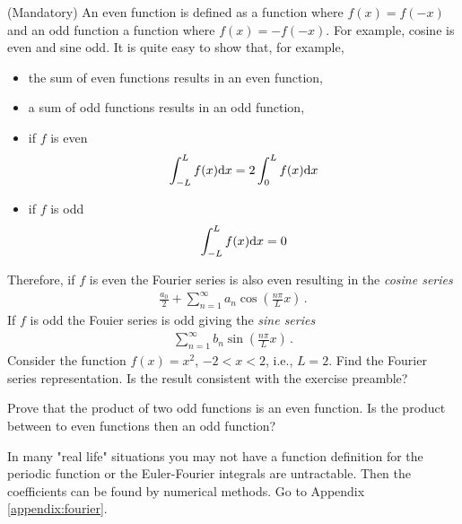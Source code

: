 \begin{exerciseregion}
	\begin{exercise} \label{ex:fourierevenodd}
		(Mandatory) An even function is defined as a function where $f(x) = f(-x)$ and an odd function a function
		where $f(x) = -f(-x)$. For example, cosine is even and sine odd. It is quite easy to show 
		that, for example,  
		\begin{itemize}
			\item the sum of even functions results in an even function,
			\item a sum of odd functions results in an odd function,
			\item if $f$ is even \[ \int_{-L}^L f(x) \mathrm{d} x = 2\int_0^L f(x) \mathrm{d} x\] 
			\item if $f$ is odd \[ \int_{-L}^L f(x) \mathrm{d} x = 0 \] 
		\end{itemize}	
		Therefore, if $f$ is even the Fourier series is also 
		even resulting in the \emph{cosine series}
		\begin{eqnarray}
			\frac{a_0}{2} + \sum_{n=1}^\infty a_n \cos\left(\frac{n\pi}{L}x\right) \, .
		\end{eqnarray}
		If $f$ is odd the Fouier series is odd giving the \emph{sine series}
		\begin{eqnarray}
			\sum_{n=1}^\infty b_n \sin\left(\frac{n\pi}{L}x\right) \, .
		\end{eqnarray}
		Consider the function $f(x) = x^2$, $-2<x<2$, i.e., $L=2$.
		Find the Fourier series representation. Is the result consistent with the exercise preamble?
	\end{exercise}
	
	\begin{exercise}
		Prove that the product of two odd functions is an even function. Is the product between to 
		even functions then an odd function?
		\end{exercise}

	\begin{exploration}
		In many "real life" situations you may not have a function definition for the periodic function or the 
		Euler-Fourier integrals are untractable. Then the coefficients 
		can be found by numerical methods. Go to Appendix \ref{appendix:fourier}.
	\end{exploration}
\end{exerciseregion}

